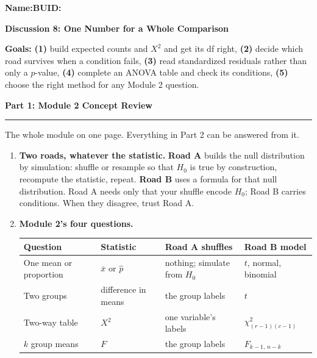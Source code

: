\documentclass[11pt]{article}
\newcommand{\blankline}[1]{\underline{\hspace{#1}}}
\newcommand{\parttitle}[1]{%
  \par\medskip\noindent
  {\large\bfseries #1}\par
  \vspace{-.5em}\noindent\rule{\linewidth}{0.4pt}\par\smallskip}
\begin{document}
\noindent\textbf{Name:}\blankline{2.3in}\hfill\textbf{BUID:}\blankline{1.6in}

\begin{center}
  {\Large\bfseries Discussion 8: One Number for a Whole Comparison}
\end{center}

\noindent\textbf{Goals:} \textbf{(1)} build expected counts and $X^2$ and get its df right,
\textbf{(2)} decide which road survives when a condition fails, \textbf{(3)} read standardized
residuals rather than only a $p$-value, \textbf{(4)} complete an ANOVA table and check its
conditions, \textbf{(5)} choose the right method for any Module 2 question.

\parttitle{Part 1: Module 2 Concept Review}

{\small

\noindent The whole module on one page. Everything in Part 2 can be answered from it.

\begin{enumerate}[label=\textbf{\arabic*.}, wide=0pt, itemsep=.4em, topsep=.5em]

\item \textbf{Two roads, whatever the statistic.} \textbf{Road A} builds the null distribution by
simulation: shuffle or resample so that $H_0$ is true by construction, recompute the statistic,
repeat. \textbf{Road B} uses a formula for that null distribution. Road A needs only that your
shuffle encode $H_0$; Road B carries conditions. When they disagree, trust Road A.

\item \textbf{Module 2's four questions.}

\begin{center}
\renewcommand{\arraystretch}{1.1}
\begin{tabular}{llll}
\toprule
\textbf{Question} & \textbf{Statistic} & \textbf{Road A shuffles} & \textbf{Road B model} \\
\midrule
One mean or proportion & $\bar{x}$ or $\hat{p}$ & nothing; simulate from $H_0$ & $t$, normal, binomial \\
Two groups & difference in means & the group labels & $t$ \\
Two-way table & $X^2$ & one variable's labels & $\chi^2_{(r-1)(c-1)}$ \\
$k$ group means & $F$ & the group labels & $F_{k-1,\,n-k}$ \\
\bottomrule
\end{tabular}
\end{center}


\end{enumerate}}
\end{document}
